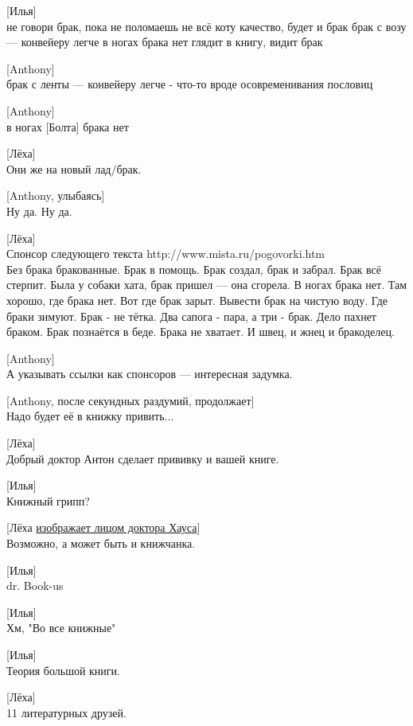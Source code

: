 [Илья]\\
не говори брак, пока не поломаешь
не всё коту качество, будет и брак
брак с возу — конвейеру легче
в ногах брака нет
глядит в книгу, видит брак


[Anthony]\\
брак с ленты — конвейеру легче - что-то вроде осовременивания пословиц


[Anthony]\\
в ногах [Болта] брака нет


[Лёха]\\
Они же на новый лад/брак.


[Anthony, улыбаясь]\\
Ну да. Ну да.


[Лёха]\\
Спонсор следующего текста http://www.mista.ru/pogovorki.htm\\

Без брака бракованные.
Брак в помощь.
Брак создал, брак и забрал.
Брак всё стерпит.
Была у собаки хата, брак пришел — она сгорела.
В ногах брака нет.
Там хорошо, где брака нет.
Вот где брак зарыт.
Вывести брак на чистую воду.
Где браки зимуют.
Брак - не тётка.
Два сапога - пара, а три - брак.
Дело пахнет браком.
Брак познаётся в беде.
Брака не хватает.
И швец, и жнец и бракоделец.


[Anthony]\\
А указывать ссылки как спонсоров --- интересная задумка.


[Anthony, после секундных раздумий, продолжает]\\
Надо будет её в книжку привить...


[Лёха]\\
Добрый доктор Антон сделает прививку и вашей книге.


[Илья]\\
Книжный грипп?


[Лёха \href{http://i5.imageban.ru/out/2014/09/04/442aff271469c9b3f514584819fcc35c.jpg}{изображает лицом доктора Хауса}]\\
Возможно, а может быть и книжчанка.


[Илья]\\
dr. Book-us


[Илья]\\
Хм, "Во все книжные"


[Илья]\\
Теория большой книги.


[Лёха]\\
11 литературных друзей.


